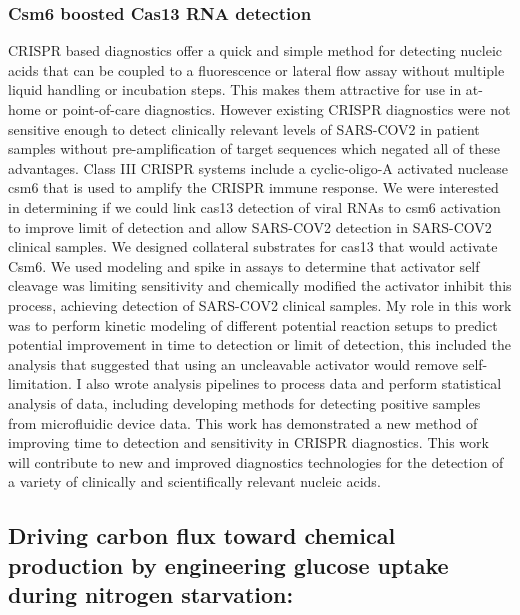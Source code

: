 \documentclass{article}
\begin{document}
\subsubsection{Csm6 boosted Cas13 RNA detection}
CRISPR based diagnostics offer a quick and simple method for detecting nucleic acids that can be coupled to a fluorescence or lateral flow assay without multiple liquid handling or incubation steps.
This makes them attractive for use in at-home or point-of-care diagnostics.
However existing CRISPR diagnostics were not sensitive enough to detect clinically relevant levels of SARS-COV2 in patient samples without pre-amplification of target sequences which negated all of these advantages.
Class III CRISPR systems include a cyclic-oligo-A activated nuclease csm6 that is used to amplify the CRISPR immune response.
We were interested in determining if we could link cas13 detection of viral RNAs to csm6 activation to improve limit of detection and allow SARS-COV2 detection in SARS-COV2 clinical samples.
We designed collateral substrates for cas13 that would activate Csm6.
We used modeling and spike in assays to determine that activator self cleavage was limiting sensitivity and chemically modified the activator inhibit this process, achieving detection of SARS-COV2 clinical samples.
My role in this work was to perform kinetic modeling of different potential reaction setups to predict potential improvement in time to detection or limit of detection, this included the analysis that suggested that using an uncleavable activator would remove self-limitation.
I also wrote analysis pipelines to process data and perform statistical analysis of data, including developing methods for detecting positive samples from microfluidic device data.
This work has demonstrated a new method of improving time to detection and sensitivity in CRISPR diagnostics. 
This work will contribute to new and improved diagnostics technologies for the detection of a variety of clinically and scientifically relevant nucleic acids.
%

\nocite{Liu2021-pu,Liu2019-nk}
\printbibliography[heading=none]

\leavevmode\newline

\newrefsection
\subsection{Driving carbon flux toward chemical production by engineering glucose uptake during nitrogen starvation:}
\end{document}
